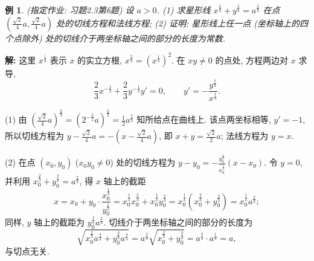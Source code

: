 \documentclass[UTF8,openany]{ctexbook}
\theoremstyle{chinesetextbook}
\newtheorem{example}{例}[section]
\newenvironment{cnsolution}{\par\indent\textbf{解:} \ignorespaces}{\par}
\begin{document}
\begin{example}\label{ex:c2-h3-6}
\textnormal{(指定作业: 习题2.3第6题)} 设 $a>0$. (1) 求星形线 $x^{\frac23}+y^{\frac23}=a^{\frac23}$ 在点 $\displaystyle\left(\frac{\sqrt2}4a,\frac{\sqrt2}4a\right)$ 处的切线方程和法线方程; (2) 证明: 星形线上任一点 (坐标轴上的四个点除外) 处的切线介于两坐标轴之间的部分的长度为常数.
\end{example}
\begin{cnsolution}
这里 $x^{\frac13}$ 表示 $x$ 的实立方根, $x^{\frac23}=\left(x^{\frac13}\right)^2$. 在 $xy\ne0$ 的点处, 方程两边对 $x$ 求导,
\[
\frac23x^{-\frac13}+\frac23y^{-\frac13}y'=0,\qquad y'=-\frac{y^{\frac13}}{x^{\frac13}}.
\]

(1) 由 $\displaystyle\left(\frac{\sqrt2}4a\right)^{\frac23}=\left(2^{-\frac32}a\right)^{\frac23}=\frac12a^{\frac23}$ 知所给点在曲线上. 该点两坐标相等, $y'=-1$, 所以切线方程为 $\displaystyle y-\frac{\sqrt2}4a=-\left(x-\frac{\sqrt2}4a\right)$, 即 $\displaystyle x+y=\frac{\sqrt2}2a$; 法线方程为 $y=x$.

(2) 在点 $(x_0,y_0)$ ($x_0y_0\ne0$) 处的切线方程为 $\displaystyle y-y_0=-\frac{y_0^{\frac13}}{x_0^{\frac13}}(x-x_0)$. 令 $y=0$, 并利用 $x_0^{\frac23}+y_0^{\frac23}=a^{\frac23}$, 得 $x$ 轴上的截距
\[
x=x_0+y_0\cdot\frac{x_0^{\frac13}}{y_0^{\frac13}}=x_0^{\frac13}x_0^{\frac23}+x_0^{\frac13}y_0^{\frac23}=x_0^{\frac13}\left(x_0^{\frac23}+y_0^{\frac23}\right)=x_0^{\frac13}a^{\frac23};
\]
同样, $y$ 轴上的截距为 $y_0^{\frac13}a^{\frac23}$. 切线介于两坐标轴之间的部分的长度为
\[
\sqrt{x_0^{\frac23}a^{\frac43}+y_0^{\frac23}a^{\frac43}}=a^{\frac23}\sqrt{x_0^{\frac23}+y_0^{\frac23}}=a^{\frac23}\cdot a^{\frac13}=a,
\]
与切点无关.
\end{cnsolution}
\end{document}
